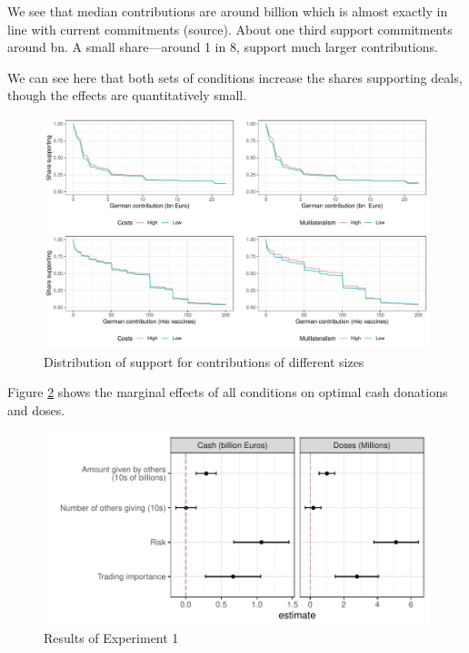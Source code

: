 \documentclass[12pt,oneside,smallheadings,chapterprefix=true]{article}
\begin{document}
We see that median contributions are around  billion which is almost exactly in line with current commitments (source). About one third support commitments around  bn. A small share---around 1 in 8, support much larger contributions. 

We can see here that both sets of conditions increase the shares supporting deals, though the effects are quantitatively small. 


\begin{figure}[hbt!]
	\includegraphics[width=\linewidth]{"../2_output/cumulative.pdf"}
	\caption{Distribution of support for contributions of different sizes}
	\label{fig:hist1}
\end{figure}

Figure \ref{fig:main1} shows the marginal effects of all conditions on optimal cash donations and doses.

\begin{figure}[hbt!]
	\includegraphics[width=\linewidth]{"../2_output/E1_main.pdf"}
	\caption{Results of Experiment 1}
	\label{fig:main1}
\end{figure}
\end{document}
